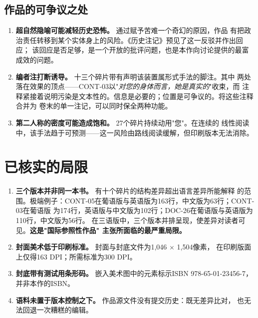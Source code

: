 \documentclass[11pt,a4paper]{article}
\begin{document}
\subsection{作品的可争议之处}

\begin{enumerate}
\item \textbf{超自然隐喻可能减轻历史恐怖。} 通过赋予苦难一个奇幻的原因，作品
有把政治责任转移到某个实体身上的风险。《历史注记》预见了这一反驳并作出回应；
该回应是否足够，是一个开放的批评问题，也是本作向讨论提供的最富成效的问题。

\item \textbf{编者注打断诱导。} 十三个碎片带有声明该装置属形式手法的脚注。其中
两处落在效果的顶点——CONT-03以"\textit{对您的身体而言，她是真实的}"收束，而
注释紧接着说明污染是文本性的。信息是必要的；位置是可争议的。将这些注释合并为
卷末的单一注记，可以同时保全两种功能。

\item \textbf{第二人称的密度可能造成饱和。} 27个碎片持续动用"您"。在连续的
线性阅读中，该手法趋于可预测——这一风险由路线阅读缓解，但印刷版本无法消除。
\end{enumerate}

\section{已核实的局限}
\label{sec:limites}

\begin{enumerate}
\item \textbf{三个版本并非同一本书。} 有十个碎片的结构差异超出语言差异所能解释
的范围。极端例子：CONT-05在葡语版与英语版为163行，中文版为63行；CONT-03在葡语版
为174行，英语版与中文版为102行；DOC-26在葡语版与英语版为110行，中文版为56行。
在三语版中，三个版本并排呈现，使差异对读者可见。\textbf{这是"国际参照性作品"
主张所面临的最严重局限。}

\item \textbf{封面美术低于印刷标准。} 封面与封底文件为1,046 $\times$ 1,504像素，
在印刷版面上仅得163 DPI；所需标准为300 DPI。

\item \textbf{封底带有测试用条形码。} 嵌入美术图中的元素标示ISBN
978-65-01-23456-7，并非本作的ISBN。

\item \textbf{语料未置于版本控制之下。} 作品源文件没有提交历史：既无差异比对，
也无法回退一次糟糕的编辑。
\end{enumerate}
\end{document}
